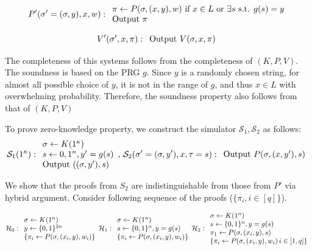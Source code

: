 \documentclass[12pt]{tufte-book}
\begin{document}
\[ P'(\sigma'=(\sigma, y), x, w): 
\begin{array}{l l} 
\pi \leftarrow P(\sigma, (x,y), w)\text{ if }x \in L \text{ or } \exists s\text{ s.t. } g(s)=y \\
\text{Output }\pi \\
\end{array} \]

\[ V'(\sigma', x, \pi): 
\begin{array}{l l} 
\text{Output } V(\sigma, x, \pi)
\end{array} \]

The completeness of this systems follows from the completeness of $(K, P, V)$. The soundness is based on the PRG $g$. Since $y$ is a randomly chosen string, for almost all possible choice of $y$, it is not in the range of $g$, and thus $x \in L$ with overwhelming probability. Therefore, the soundness property also follows from that of $(K,P,V)$

To prove zero-knowledge property, we construct the simulator $\mathcal{S}_1, \mathcal{S}_2$ as follows:
\[ \mathcal{S}_1(1^\kappa): 
\begin{array}{l l} 
\sigma \leftarrow K(1^\kappa) \\
s \leftarrow {0,1}^{n}, y' = g(s) \\
\text{Output } ((\sigma, y'), s)
\end{array}
\text{, }
\mathcal{S}_2(\sigma'=(\sigma, y'), x, \tau=s): 
\begin{array}{l l} 
\text{Output } P(\sigma, (x,y'), s) \\
\end{array} \]

We show that the proofs from $S_2$ are indistinguishable from those from $P'$ via hybrid argument. Consider following sequence of the proofs ($\{\pi_i, i \in [q]\}$).

\[ 
\mathcal{H}_0: 
\begin{array}{l l} 
\sigma \leftarrow K(1^n) \\
y \leftarrow \{0,1\}^{2n} \\
\{\pi_i \leftarrow P(\sigma, (x_i, y), w_i)\}
\end{array} 
\mathcal{H}_1: 
\begin{array}{l l} 
\sigma \leftarrow K(1^n) \\
s \leftarrow \{0,1\}^{n},  y = g(s) \\
\{\pi_i \leftarrow P(\sigma, (x_i, y), w_i)\}
\end{array} 
\mathcal{H}_2: 
\begin{array}{l l} 
\sigma \leftarrow K(1^n) \\
s \leftarrow \{0,1\}^{n},  y = g(s) \\
\pi_1 \leftarrow P(\sigma, (x_i, y), s) \\
\{\pi_i \leftarrow P(\sigma, (x_i, y), w_i)\, i \in [1,q]\}
\end{array} 
\]
\end{document}
